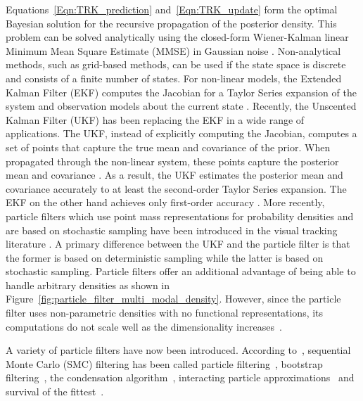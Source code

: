 Equations~\ref{Eqn:TRK_prediction} and~\ref{Eqn:TRK_update} form the optimal Bayesian solution for the recursive propagation of the posterior density.  This problem can be solved analytically using the closed-form Wiener-Kalman linear Minimum Mean Square Estimate (MMSE) in Gaussian noise \cite{1964_JNL_BayesianEstimation_Ho, 1993_BOOK_SSP_Kay}.  Non-analytical methods, such as grid-based methods, can be used if the state space is discrete and consists of a finite number of states.  For non-linear models, the Extended Kalman Filter (EKF) computes the Jacobian for a Taylor Series expansion of the system and observation models about the current state \cite{2005_Misc_KalmanFilterComparison_Orderud}.  Recently, the Unscented Kalman Filter (UKF) has been replacing the EKF in a wide range of applications.  The UKF, instead of explicitly computing the Jacobian, computes a set of points that capture the true mean and covariance of the prior.  When propagated through the non-linear system, these points capture the posterior mean and covariance \cite{1997_CNF_UKF_Julier}.  As a result, the UKF estimates the posterior mean and covariance accurately to at least the second-order Taylor Series expansion.  The EKF on the other hand achieves only first-order accuracy \cite{2004_CNF_SigmaPointKalman_Merwe, 2000_CNF_UKF_Wan}.  More recently, particle filters which use point mass representations for probability densities and are based on stochastic sampling have been introduced in the visual tracking literature \cite{1993_JNL_ParticleFilter_Gordon, 2001_JNL_PFjumpMarkov_Doucet}.  A primary difference between the UKF and the particle filter is that the former is based on deterministic sampling while the latter is based on stochastic sampling.  Particle filters offer an additional advantage of being able to handle arbitrary densities as shown in Figure~\ref{fig:particle_filter_multi_modal_density}.  However, since the particle filter uses non-parametric densities with no functional representations, its computations do not scale well as the dimensionality increases~\cite{2004_CNF_TrackingPeople_Zhao}.  

A variety of particle filters have now been introduced.   According to~\cite{2002_JNL_PF_Arulampalam}, sequential Monte Carlo (SMC) filtering has been called particle filtering~\cite{1999_CNF_PF_carpenter}, bootstrap filtering~\cite{1993_JNL_ParticleFilter_Gordon}, the condensation algorithm~\cite{1998_JNL_Condensation_IsardBlake}, interacting particle approximations~\cite{1999_JNL_PF_Crisan, 1999_BK_PF_Moral} and survival of the fittest~\cite{1995_CNF_PF_Kanazawa}.


